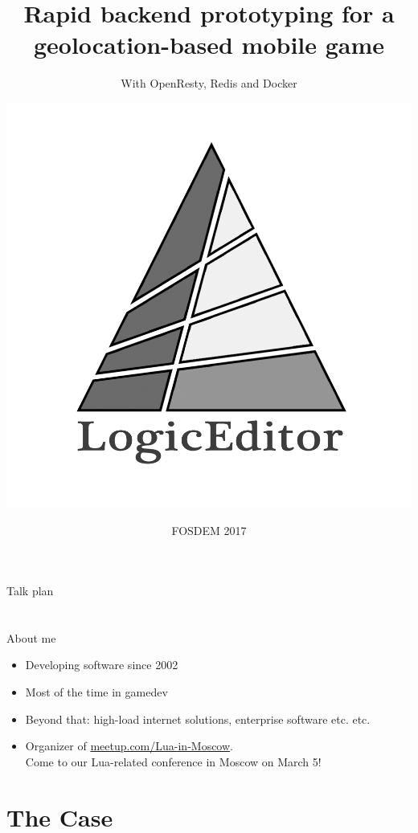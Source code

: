\documentclass[aspectratio=169,handout,bigger]{beamer}
\title{Rapid backend prototyping for a geolocation-based mobile game}
\subtitle{With OpenResty, Redis and Docker}
\author{\includegraphics[height=.4\textheight]{logo}}
\institute{Alexander Gladysh <ag@logiceditor.com>\newline@agladysh}
\date{FOSDEM 2017}
\begin{document}
\begin{frame}[plain]
 \titlepage
\end{frame}


\begin{frame}{Talk plan}

\tableofcontents

\end{frame}


\section*{}

\begin{frame}{About me}

\begin{itemize}
\item Developing software since 2002
\item Most of the time in gamedev
\item Beyond that: high-load internet solutions, enterprise software etc. etc.
\item Organizer of
      \href{http://meetup.com/Lua-in-Moscow}{meetup.com/Lua-in-Moscow}. \\
      Come to our Lua-related conference in Moscow on March 5!
\end{itemize}

\end{frame}


\section{The Case}

\end{document}
